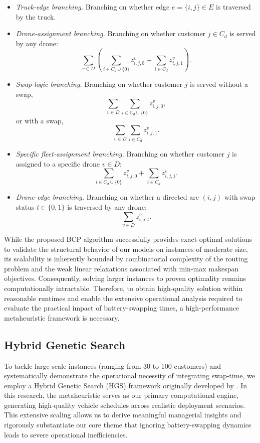 \documentclass[3p, authoryear, 11pt]{elsarticle}
\begin{document}
\begin{itemize}
    \item \emph{Truck-edge branching.}
    Branching on whether edge $e=\{i,j\}\in E$ is traversed by the truck.

    \item \emph{Drone-assignment branching.}
    Branching on whether customer $j\in C_d$ is served by any drone:
    \[
    \sum_{v\in D}
    \left(
    \sum_{i\in C_d\cup\{0\}}z_{i,j,0}^v
    +
    \sum_{i\in C_d}z_{i,j,1}^v
    \right).
    \]

    \item \emph{Swap-logic branching.}
    Branching on whether customer $j$ is served without a swap,
    \[
    \sum_{v\in D}
    \sum_{i\in C_d\cup\{0\}} z_{i,j,0}^v,
    \]
    or with a swap,
    \[
    \sum_{v\in D}
    \sum_{i\in C_d} z_{i,j,1}^v.
    \]

    \item \emph{Specific fleet-assignment branching.}
    Branching on whether customer $j$ is assigned to a specific drone $v\in D$:
    \[
    \sum_{i\in C_d\cup\{0\}}z_{i,j,0}^v
    +
    \sum_{i\in C_d}z_{i,j,1}^v.
    \]

    \item \emph{Drone-edge branching.}
    Branching on whether a directed arc $(i,j)$ with swap status $t\in\{0,1\}$ is traversed by any drone:
    \[
    \sum_{v\in D} z_{i,j,t}^v.
    \]
\end{itemize}

While the proposed BCP algorithm successfully provides exact optimal solutions to validate the structural behavior of our models on instances of moderate size, its scalability is inherently bounded by combinatorial complexity of the routing problem and the weak linear relaxations associated with min-max makespan objectives. Consequently, solving larger instances to proven optimality remains computationally intractable. Therefore, to obtain high-quality solution within reasonable runtimes and enable the extensive operational analysis required to evaluate the practical impact of battery-swapping times, a high-performance metaheuristic framework is necessary.

\subsection{Hybrid Genetic Search}
\label{sec:hgs}

To tackle large-scale instances (ranging from 30 to 100 customers) and systematically demonstrate the operational necessity of integrating swap-time, we employ a Hybrid Genetic Search (HGS) framework originally developed by \citet{vidal_hybrid_2013, vidal_hgs_2022}. In this research, the metaheuristic serves as our primary computational engine, generating high-quality vehicle schedules across realistic deployment scenarios. This extensive scaling allows us to derive meaningful managerial insights and rigorously substantiate our core theme that ignoring battery-swapping dynamics leads to severe operational inefficiencies.
\end{document}

